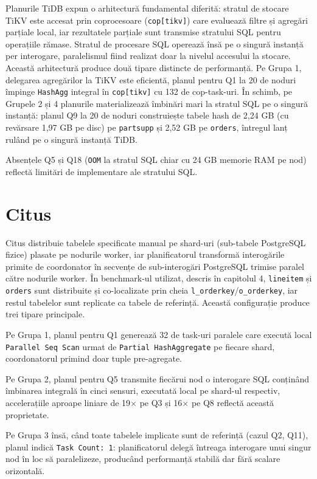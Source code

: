 Planurile TiDB expun o arhitectură fundamental diferită: stratul de stocare TiKV este accesat prin coprocesoare (\texttt{cop[tikv]}) care evaluează filtre și agregări parțiale local, iar rezultatele parțiale sunt transmise stratului SQL pentru operațiile rămase. Stratul de procesare SQL operează însă pe o singură instanță per interogare, paralelismul fiind realizat doar la nivelul accesului la stocare. Această arhitectură produce două tipare distincte de performanță. Pe Grupa 1, delegarea agregărilor la TiKV este eficientă, planul pentru Q1 la 20 de noduri împinge \texttt{HashAgg} integral în \texttt{cop[tikv]} cu 132 de cop-task-uri. În schimb, pe Grupele 2 și 4 planurile materializează îmbinări mari la stratul SQL pe o singură instanță: planul Q9 la 20 de noduri construiește tabele hash de 2,24 GB (cu revărsare 1,97 GB pe disc) pe \texttt{partsupp} și 2,52 GB pe \texttt{orders}, întregul lanț rulând pe o singură instanță TiDB. 

Absențele Q5 și Q18 (\texttt{OOM} la stratul SQL chiar cu 24 GB memorie RAM pe nod) reflectă limitări de implementare ale stratului SQL.

\section{Citus}

Citus distribuie tabelele specificate manual pe shard-uri (sub-tabele PostgreSQL fizice) plasate pe nodurile worker, iar planificatorul transformă interogările primite de coordonator în secvențe de sub-interogări PostgreSQL trimise paralel către nodurile worker. În benchmark-ul utilizat, descris în capitolul 4, \texttt{lineitem} și \texttt{orders} sunt distribuite și co-localizate prin cheia \texttt{l\_orderkey}/\texttt{o\_orderkey}, iar restul tabelelor sunt replicate ca tabele de referință. Această configurație produce trei tipare principale. 

Pe Grupa 1, planul pentru Q1 generează 32 de task-uri paralele care execută local \texttt{Parallel Seq Scan} urmat de \texttt{Partial HashAggregate} pe fiecare shard, coordonatorul primind doar tuple pre-agregate. 

Pe Grupa 2, planul pentru Q5 transmite fiecărui nod o interogare SQL conținând îmbinarea integrală în cinci sensuri, executată local pe shard-ul respectiv, accelerațiile aproape liniare de 19$\times$ pe Q3 și 16$\times$ pe Q8 reflectă această proprietate.

Pe Grupa 3 însă, când toate tabelele implicate sunt de referință (cazul Q2, Q11), planul indică \texttt{Task Count: 1}: planificatorul delegă întreaga interogare unui singur nod în loc să paralelizeze, producând performanță stabilă dar fără scalare orizontală.
